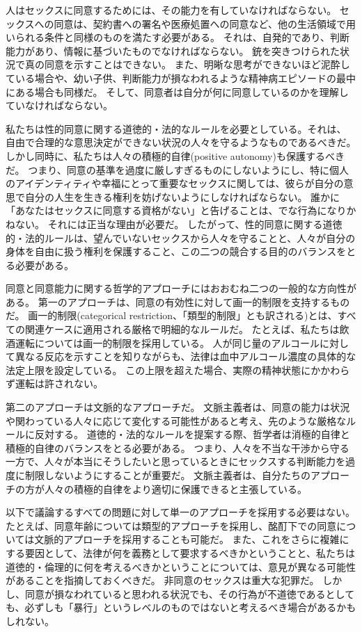 \documentclass[paper=a4,book,openany]{jlreq}
\begin{document}
人はセックスに同意するためには、その能力を有していなければならない。
セックスへの同意は、契約書への署名や医療処置への同意など、他の生活領域で用いられる条件と同様のものを満たす必要がある。
それは、自発的であり、判断能力があり、情報に基づいたものでなければならない。
銃を突きつけられた状況で真の同意を示すことはできない。
また、明晰な思考ができないほど泥酔している場合や、幼い子供、判断能力が損なわれるような精神病エピソードの最中にある場合も同様だ。
そして、同意者は自分が何に同意しているのかを理解していなければならない。

私たちは性的同意に関する道徳的・法的なルールを必要としている。それは、
自由で合理的な意思決定ができない状況の人々を守るようなものであるべきだ。
しかし同時に、私たちは人々の積極的自律(positive autonomy)も保護するべきだ。
つまり、同意の基準を過度に厳しすぎるものにしないようにし、特に個人のアイデンティティや幸福にとって重要なセックスに関しては、彼らが自分の意思で自分の人生を生きる権利を妨げないようにしなければならない。
誰かに「あなたはセックスに同意する資格がない」と告げることは、でな行為になりかねない。
それには正当な理由が必要だ。
したがって、性的同意に関する道徳的・法的ルールは、望んでいないセックスから人々を守ることと、人々が自分の身体を自由に扱う権利を保護すること、この二つの競合する目的のバランスをとる必要がある。

同意と同意能力に関する哲学的アプローチにはおおむね二つの一般的な方向性がある。
第一のアプローチは、同意の有効性に対して画一的制限を支持するものだ。
画一的制限(categorical restriction、「類型的制限」とも訳される)とは、すべての関連ケースに適用される厳格で明細的なルールだ。
たとえば、私たちは飲酒運転については画一的制限を採用している。
人が同じ量のアルコールに対して異なる反応を示すことを知りながらも、法律は血中アルコール濃度の具体的な法定上限を設定している。
この上限を超えた場合、実際の精神状態にかかわらず運転は許されない。

第二のアプローチは文脈的なアプローチだ。
文脈主義者は、同意の能力は状況や関わっている人々に応じて変化する可能性があると考え、先のような厳格なルールに反対する。
道徳的・法的なルールを提案する際、哲学者は消極的自律と積極的自律のバランスをとる必要がある。
つまり、人々を不当な干渉から守る一方で、人々が本当にそうしたいと思っているときにセックスする判断能力を過度に制限しないようにすることが重要だ。
文脈主義者は、自分たちのアプローチの方が人々の積極的自律をより適切に保護できると主張している。

以下で議論するすべての問題に対して単一のアプローチを採用する必要はない。
たとえば、同意年齢については類型的アプローチを採用し、酩酊下での同意については文脈的アプローチを採用することも可能だ。
また、これをさらに複雑にする要因として、法律が何を義務として要求するべきかということと、私たちは道徳的・倫理的に何を考えるべきかということについては、意見が異なる可能性があることを指摘しておくべきだ。
非同意のセックスは重大な犯罪だ。
しかし、同意が損なわれていると思われる状況でも、その行為が不道徳であるとしても、必ずしも「暴行」というレベルのものではないと考えるべき場合があるかもしれない。
\end{document}
